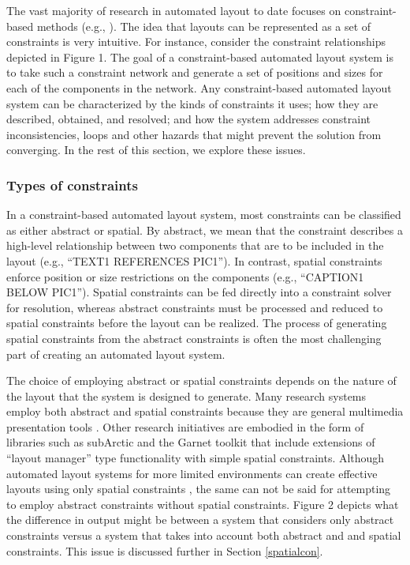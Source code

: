     The vast majority of research in automated layout to date focuses on
    constraint-based methods (e.g.,
    \citep{vanderzanden-1,borning-1,graf-1,hudson-3,kochhar-1,hudson-2,weitzman-2,myers-2}).
    The idea that layouts can be represented as a set of constraints is very
    intuitive. For instance, consider the constraint relationships depicted in
    Figure 1. The goal of a constraint-based automated layout system is to take
    such a constraint network and generate a set of positions and sizes for
    each of the components in the network. Any constraint-based automated
    layout system can be characterized by the kinds of constraints it uses; how
    they are described, obtained, and resolved; and how the system addresses
    constraint inconsistencies, loops and other hazards that might prevent the
    solution from converging. In the rest of this section, we explore these
    issues.

    \subsubsection{Types of constraints}

     In a constraint-based automated layout system, most constraints can be
     classified as either abstract or spatial. By abstract, we mean that the
     constraint describes a high-level relationship between two components that
     are to be included in the layout (e.g., “TEXT1 REFERENCES PIC1”). In
     contrast, spatial constraints enforce position or size restrictions on the
     components (e.g., “CAPTION1 BELOW PIC1”). Spatial constraints can be fed
     directly into a constraint solver for resolution, whereas abstract
     constraints must be processed and reduced to spatial constraints before the
     layout can be realized. The process of generating spatial constraints from
     the abstract constraints is often the most challenging part of creating an
     automated layout system.

     The choice of employing abstract or spatial constraints depends on the
     nature of the layout that the system is designed to generate. Many research
     systems employ both abstract and spatial constraints because they are
     general multimedia presentation tools \citep{feiner-1,weitzman-2,graf-1}.
     Other research initiatives are embodied in the form of libraries such as
     subArctic \citep{hudson-3,hudson-1} and the Garnet toolkit \citep{myers-2}
     that include extensions of “layout manager” type functionality with simple
     spatial constraints. Although automated layout systems for more limited
     environments can create effective layouts using only spatial constraints
     \citep{kosak-1}, the same can not be said for attempting to employ abstract
     constraints without spatial constraints. Figure 2 depicts what the
     difference in output might be between a system that considers only abstract
     constraints versus a system that takes into account both abstract and and
     spatial constraints. This issue is discussed further in Section
     \ref{spatialcon}.

